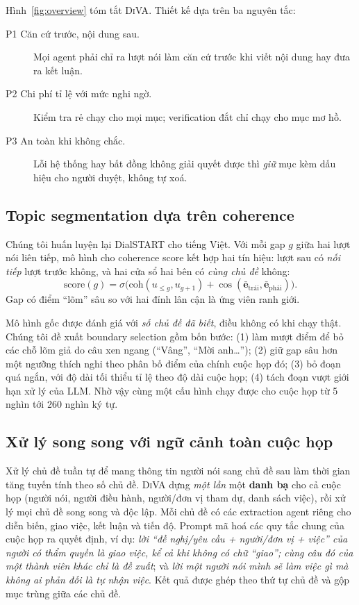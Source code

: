 \documentclass[11pt]{article}
\newcommand{\diva}{\textsc{DiVA}}
\begin{document}
Hình~\ref{fig:overview} tóm tắt \diva{}. Thiết kế dựa trên ba nguyên tắc:
\begin{description}
  \item[P1 Căn cứ trước, nội dung sau.] Mọi agent phải chỉ ra lượt nói làm căn cứ trước khi viết nội
        dung hay đưa ra kết luận.
  \item[P2 Chi phí tỉ lệ với mức nghi ngờ.] Kiểm tra rẻ chạy cho mọi mục; verification đắt chỉ chạy cho
        mục mơ hồ.
  \item[P3 An toàn khi không chắc.] Lỗi hệ thống hay bất đồng không giải quyết được thì \emph{giữ} mục
        kèm dấu hiệu cho người duyệt, không tự xoá.
\end{description}

\subsection{Topic segmentation dựa trên coherence}
\label{sec:seg}

Chúng tôi huấn luyện lại DialSTART \citep{gao2023dialstart} cho tiếng Việt. Với mỗi gap $g$ giữa hai lượt
nói liên tiếp, mô hình cho coherence score kết hợp hai tín hiệu: lượt sau có \emph{nối tiếp} lượt trước
không, và hai cửa sổ hai bên có \emph{cùng chủ đề} không:
\begin{equation}
\mathrm{score}(g)=\sigma\big(\mathrm{coh}(u_{\le g},u_{g+1})+\cos(\bar{\mathbf{e}}_{\text{trái}},\bar{\mathbf{e}}_{\text{phải}})\big).
\end{equation}
Gap có điểm ``lõm'' sâu so với hai đỉnh lân cận là ứng viên ranh giới.

Mô hình gốc được đánh giá với \emph{số chủ đề đã biết}, điều không có khi chạy thật. Chúng tôi đề xuất boundary selection gồm bốn bước: (1) làm mượt điểm để bỏ các chỗ lõm giả do câu xen ngang (``Vâng'', ``Mời
anh\ldots''); (2) giữ gap sâu hơn một ngưỡng thích nghi theo phân bố điểm của chính cuộc họp đó; (3) bỏ
đoạn quá ngắn, với độ dài tối thiểu tỉ lệ theo độ dài cuộc họp; (4) tách đoạn vượt giới hạn xử lý của LLM.
Nhờ vậy cùng một cấu hình chạy được cho cuộc họp từ 5 nghìn tới 260 nghìn ký tự.

\subsection{Xử lý song song với ngữ cảnh toàn cuộc họp}

Xử lý chủ đề tuần tự để mang thông tin người nói sang chủ đề sau làm thời gian tăng tuyến tính theo số
chủ đề. \diva{} dựng \emph{một lần} một \textbf{danh bạ} cho cả cuộc họp (người nói, người điều hành,
người/đơn vị tham dự, danh sách việc), rồi xử lý mọi chủ đề song song và độc lập. Mỗi chủ đề có các extraction agent riêng cho diễn biến, giao việc, kết luận và tiến độ. Prompt mã hoá các quy tắc chung của
cuộc họp ra quyết định, ví dụ: \emph{lời ``đề nghị/yêu cầu + người/đơn vị + việc'' của người có thẩm quyền
là giao việc, kể cả khi không có chữ ``giao''; cùng câu đó của một thành viên khác chỉ là đề xuất}; và
\emph{lời một người nói mình sẽ làm việc gì mà không ai phản đối là tự nhận việc}. Kết quả được ghép theo
thứ tự chủ đề và gộp mục trùng giữa các chủ đề.
\end{document}
